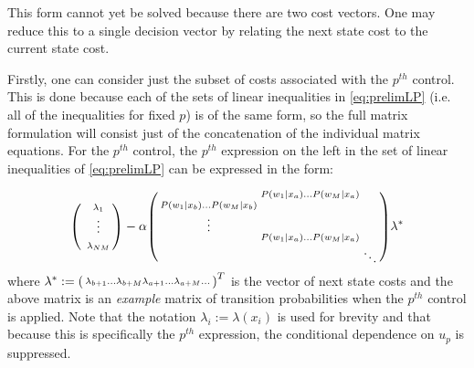 \documentclass[conference]{IEEEtran}
\begin{document}
This form cannot yet be solved because there are two cost vectors. One may reduce this to a single decision vector by relating the next state cost to the current state cost.

Firstly, one can consider just the subset of costs associated with the $p^{th}$ control. This is done because each of the sets of linear inequalities in \eqref{eq:prelimLP} (i.e. all of the inequalities for fixed $p$) is of the same form, so the full matrix formulation will consist just of the concatenation of the individual matrix equations. For the $p^{th}$ control, the $p^{th}$ expression on the left in the set of linear inequalities of \eqref{eq:prelimLP} can be expressed in the form:

\begin{gather}\label{eq:mtxLPineq}
\begin{psmallmatrix}
& \lambda_{1}\\
& \vdots\\
& \\
& \lambda_{NM}
\end{psmallmatrix}
-
\alpha
\begin{psmallmatrix}
& P(w_{1}|x_{a}) \hdots  P(w_{M}|x_{a})  \\
P(w_{1}|x_{b}) \hdots  P(w_{M}|x_{b}) \\
\vdots\\
& P(w_{1}|x_{a}) \hdots  P(w_{M}|x_{a})  \\
& & \ddots
\end{psmallmatrix}
\lambda^{*}\end{gather} where $\lambda^{*} := \begin{psmallmatrix}
\lambda_{b+1} \hdots \lambda_{b+M} \lambda_{a+1}\hdots \lambda_{a+M} \hdots \end{psmallmatrix}^{T}$ is the vector of next state costs and the above matrix is an \textit{example} matrix of transition probabilities when the $p^{th}$ control is applied. Note that the notation $\lambda_{i}:=\lambda(x_{i})$ is used for brevity and that because this is specifically the $p^{th}$ expression, the conditional dependence on $u_{p}$ is suppressed.
\end{document}
